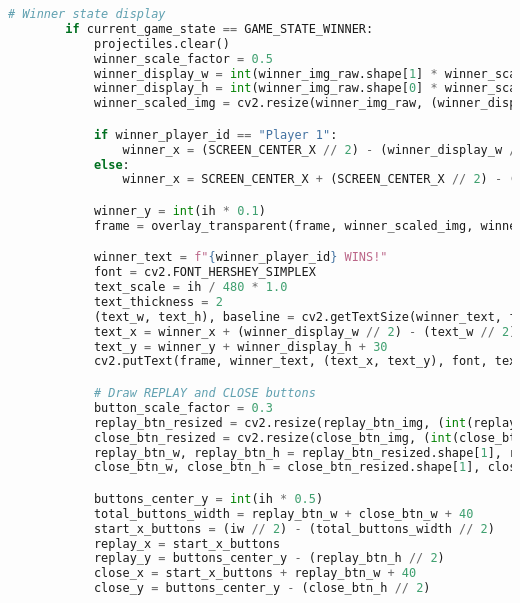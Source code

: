 \documentclass[11pt,a4paper]{article}
\begin{document}
\begin{lstlisting}[language=Python, caption=fungsi main]
        # Winner state display
        if current_game_state == GAME_STATE_WINNER:
            projectiles.clear()
            winner_scale_factor = 0.5
            winner_display_w = int(winner_img_raw.shape[1] * winner_scale_factor)
            winner_display_h = int(winner_img_raw.shape[0] * winner_scale_factor)
            winner_scaled_img = cv2.resize(winner_img_raw, (winner_display_w, winner_display_h), interpolation=cv2.INTER_AREA)

            if winner_player_id == "Player 1":
                winner_x = (SCREEN_CENTER_X // 2) - (winner_display_w // 2)
            else:
                winner_x = SCREEN_CENTER_X + (SCREEN_CENTER_X // 2) - (winner_display_w // 2)

            winner_y = int(ih * 0.1)
            frame = overlay_transparent(frame, winner_scaled_img, winner_x, winner_y, (winner_display_w, winner_display_h))

            winner_text = f"{winner_player_id} WINS!"
            font = cv2.FONT_HERSHEY_SIMPLEX
            text_scale = ih / 480 * 1.0
            text_thickness = 2
            (text_w, text_h), baseline = cv2.getTextSize(winner_text, font, text_scale, text_thickness)
            text_x = winner_x + (winner_display_w // 2) - (text_w // 2)
            text_y = winner_y + winner_display_h + 30
            cv2.putText(frame, winner_text, (text_x, text_y), font, text_scale, (0, 255, 255), text_thickness, cv2.LINE_AA)

            # Draw REPLAY and CLOSE buttons
            button_scale_factor = 0.3
            replay_btn_resized = cv2.resize(replay_btn_img, (int(replay_btn_img.shape[1] * button_scale_factor), int(replay_btn_img.shape[0] * button_scale_factor)), interpolation=cv2.INTER_AREA)
            close_btn_resized = cv2.resize(close_btn_img, (int(close_btn_img.shape[1] * button_scale_factor), int(close_btn_img.shape[0] * button_scale_factor)), interpolation=cv2.INTER_AREA)
            replay_btn_w, replay_btn_h = replay_btn_resized.shape[1], replay_btn_resized.shape[0]
            close_btn_w, close_btn_h = close_btn_resized.shape[1], close_btn_resized.shape[0]

            buttons_center_y = int(ih * 0.5)
            total_buttons_width = replay_btn_w + close_btn_w + 40
            start_x_buttons = (iw // 2) - (total_buttons_width // 2)
            replay_x = start_x_buttons
            replay_y = buttons_center_y - (replay_btn_h // 2)
            close_x = start_x_buttons + replay_btn_w + 40
            close_y = buttons_center_y - (close_btn_h // 2)


\end{lstlisting}
\end{document}

